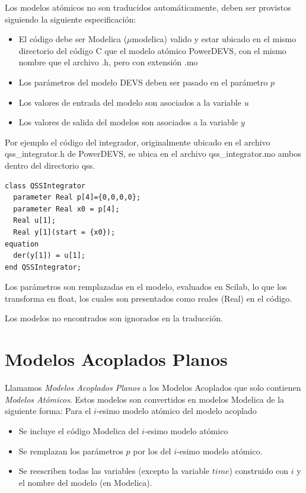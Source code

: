 \documentclass[a4paper,	11pt]{report}
\begin{document}
Los modelos atómicos no son traducidos automáticamente, deben ser provistos siguiendo la siguiente especificación:

\begin{itemize}
\item El código debe ser Modelica ($\mu$modelica) valido y estar ubicado en el mismo directorio del código C que el modelo atómico PowerDEVS, con el mismo nombre que el archivo .h, pero con extensión .mo
\item Los parámetros del modelo DEVS deben ser pasado en el parámetro $p$
\item Los valores de entrada del modelo son asociados a la variable $u$
\item Los valores de salida del modelos son asociados a la variable $y$
\end{itemize}

Por ejemplo el código del integrador, originalmente ubicado en el archivo qss\_integrator.h de PowerDEVS, se ubica en el archivo qss\_integrator.mo ambos dentro del directorio qss.

\begin{verbatim}
class QSSIntegrator
  parameter Real p[4]={0,0,0,0};
  parameter Real x0 = p[4];
  Real u[1];
  Real y[1](start = {x0});
equation
  der(y[1]) = u[1];
end QSSIntegrator;
\end{verbatim}

Los parámetros son remplazadas en el modelo, evaluados en Scilab, lo que los transforma en float, los cuales son presentados como reales (Real) en el código.

Los modelos no encontrados son ignorados en la traducción.

\section{Modelos Acoplados Planos}

Llamamos \emph{Modelos Acoplados Planos} a los Modelos Acoplados que solo contienen \emph{Modelos Atómicos}. Estos modelos son convertidos en modelos Modelica de la siguiente forma:
Para el $i$-esimo modelo atómico del modelo acoplado
\begin{itemize}
	\item Se incluye el código Modelica del $i$-esimo modelo atómico
	\item Se remplazan los parámetros $p$ por los del $i$-esimo modelo atómico.
	\item Se reescriben todas las variables (excepto la variable $time$) construido con $i$ y el nombre del modelo (en Modelica).
\end{itemize}
\end{document}

